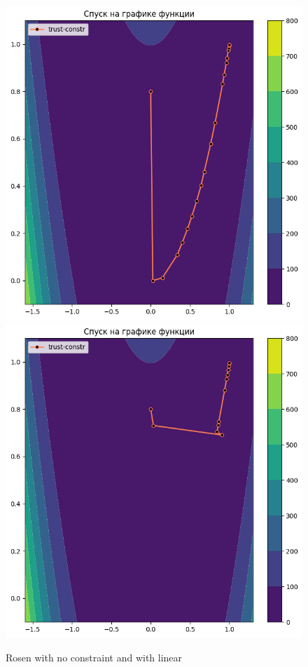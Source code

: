 \documentclass[12pt, a4paper, oneside, final]{article}
\begin{document}
	\begin{figure}[H]
		\centering
		\includegraphics[scale = 0.475]{Image/AT_ROSEN2_NO_CONSTRAINT.png}
		\includegraphics[scale = 0.475]{Image/AT_ROSEN2_LINEAR_CONSTRAINT.png}
		\caption*{Rosen with no constraint and with linear}
	\end{figure}
\end{document}

